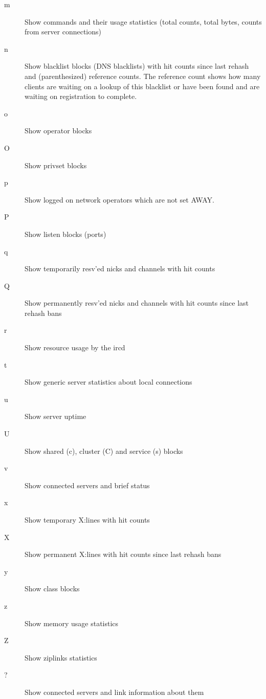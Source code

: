 \begin{description}
\item[{m}]
	Show commands and their usage statistics (total counts, total bytes,
	counts from server connections)

\item[{n}]
	Show blacklist blocks (DNS blacklists) with hit counts since last
	rehash and (parenthesized) reference counts. The reference count shows
	how many clients are waiting on a lookup of this blacklist or have been
	found and are waiting on registration to complete.

\item[{o}]
	Show operator blocks

\item[{O}]
	Show privset blocks

\item[{p}]
	Show logged on network operators which are not set AWAY.

\item[{P}]
	Show listen blocks (ports)

\item[{q}]
	Show temporarily resv'ed nicks and channels with hit counts

\item[{Q}]
	Show permanently resv'ed nicks and channels with hit counts since last
	rehash bans

\item[{r}]
	Show resource usage by the ircd

\item[{t}]
	Show generic server statistics about local connections

\item[{u}]
	Show server uptime

\item[{U}]
	Show shared (c), cluster (C) and service (s) blocks

\item[{v}]
	Show connected servers and brief status

\item[{x}]
	Show temporary X:lines with hit counts

\item[{X}]
	Show permanent X:lines with hit counts since last rehash bans

\item[{y}]
	Show class blocks

\item[{z}]
	Show memory usage statistics

\item[{Z}]
	Show ziplinks statistics

\item[{?}]
	Show connected servers and link information about them
\end{description}

